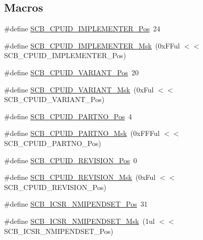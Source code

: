 \subsection*{Macros}
\begin{DoxyCompactItemize}
\item 
\#define \hyperlink{group___c_m_s_i_s___c_m3___s_c_b_ga58686b88f94f789d4e6f429fe1ff58cf}{S\-C\-B\-\_\-\-C\-P\-U\-I\-D\-\_\-\-I\-M\-P\-L\-E\-M\-E\-N\-T\-E\-R\-\_\-\-Pos}~24
\item 
\#define \hyperlink{group___c_m_s_i_s___c_m3___s_c_b_ga0932b31faafd47656a03ced75a31d99b}{S\-C\-B\-\_\-\-C\-P\-U\-I\-D\-\_\-\-I\-M\-P\-L\-E\-M\-E\-N\-T\-E\-R\-\_\-\-Msk}~(0x\-F\-Ful $<$$<$ S\-C\-B\-\_\-\-C\-P\-U\-I\-D\-\_\-\-I\-M\-P\-L\-E\-M\-E\-N\-T\-E\-R\-\_\-\-Pos)
\item 
\#define \hyperlink{group___c_m_s_i_s___c_m3___s_c_b_ga104462bd0815391b4044a70bd15d3a71}{S\-C\-B\-\_\-\-C\-P\-U\-I\-D\-\_\-\-V\-A\-R\-I\-A\-N\-T\-\_\-\-Pos}~20
\item 
\#define \hyperlink{group___c_m_s_i_s___c_m3___s_c_b_gad358dfbd04300afc1824329d128b99e8}{S\-C\-B\-\_\-\-C\-P\-U\-I\-D\-\_\-\-V\-A\-R\-I\-A\-N\-T\-\_\-\-Msk}~(0x\-Ful $<$$<$ S\-C\-B\-\_\-\-C\-P\-U\-I\-D\-\_\-\-V\-A\-R\-I\-A\-N\-T\-\_\-\-Pos)
\item 
\#define \hyperlink{group___c_m_s_i_s___c_m3___s_c_b_ga705f68eaa9afb042ca2407dc4e4629ac}{S\-C\-B\-\_\-\-C\-P\-U\-I\-D\-\_\-\-P\-A\-R\-T\-N\-O\-\_\-\-Pos}~4
\item 
\#define \hyperlink{group___c_m_s_i_s___c_m3___s_c_b_ga98e581423ca016680c238c469aba546d}{S\-C\-B\-\_\-\-C\-P\-U\-I\-D\-\_\-\-P\-A\-R\-T\-N\-O\-\_\-\-Msk}~(0x\-F\-F\-Ful $<$$<$ S\-C\-B\-\_\-\-C\-P\-U\-I\-D\-\_\-\-P\-A\-R\-T\-N\-O\-\_\-\-Pos)
\item 
\#define \hyperlink{group___c_m_s_i_s___c_m3___s_c_b_ga3c3d9071e574de11fb27ba57034838b1}{S\-C\-B\-\_\-\-C\-P\-U\-I\-D\-\_\-\-R\-E\-V\-I\-S\-I\-O\-N\-\_\-\-Pos}~0
\item 
\#define \hyperlink{group___c_m_s_i_s___c_m3___s_c_b_ga2ec0448b6483f77e7f5d08b4b81d85df}{S\-C\-B\-\_\-\-C\-P\-U\-I\-D\-\_\-\-R\-E\-V\-I\-S\-I\-O\-N\-\_\-\-Msk}~(0x\-Ful $<$$<$ S\-C\-B\-\_\-\-C\-P\-U\-I\-D\-\_\-\-R\-E\-V\-I\-S\-I\-O\-N\-\_\-\-Pos)
\item 
\#define \hyperlink{group___c_m_s_i_s___c_m3___s_c_b_ga750d4b52624a46d71356db4ea769573b}{S\-C\-B\-\_\-\-I\-C\-S\-R\-\_\-\-N\-M\-I\-P\-E\-N\-D\-S\-E\-T\-\_\-\-Pos}~31
\item 
\#define \hyperlink{group___c_m_s_i_s___c_m3___s_c_b_ga340e3f79e9c3607dee9f2c048b6b22e8}{S\-C\-B\-\_\-\-I\-C\-S\-R\-\_\-\-N\-M\-I\-P\-E\-N\-D\-S\-E\-T\-\_\-\-Msk}~(1ul $<$$<$ S\-C\-B\-\_\-\-I\-C\-S\-R\-\_\-\-N\-M\-I\-P\-E\-N\-D\-S\-E\-T\-\_\-\-Pos)
$$
\end{DoxyCompactItemize}
